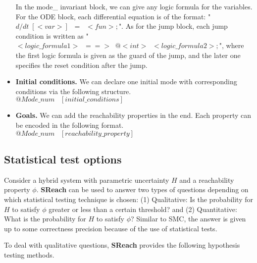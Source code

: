 \begin{itemize}
In the mode\_ invariant block, we can give any logic formula for the variables. For the ODE block, each differential equation is of the format: "$d/dt \; [<var>]\;\;=\;\;<fun>;$". As for the jump block, each jump condition is written as "$<logic\_formula1> \;\; ==> \;\; @<int>\;\;<logic\_formula2>;$", where the first logic formula is given as the guard of the jump, and the later one specifies the reset condition after the jump.\\

\item {\bf Initial conditions.} We can declare one initial mode with corresponding conditions via the following structure.\\

$
@Mode\_num\;\;\; [initial\_conditions]
$\\

\item{\bf Goals.} We can add the reachability properties in the end. Each property can be encoded in the following format.\\

$
@Mode\_num \;\;\; [reachability\_property]
$\\

\end{itemize}


\subsection{Statistical test options}

Consider a hybrid system with parametric uncertainty $H$ and a reachability property $\phi$. {\bf SReach} can be used to answer two types of questions depending on which statistical testing technique is chosen: (1) Qualitative: Is the probability for $H$ to satisfy $\phi$ greater or less than a certain threshold? and
(2) Quantitative: What is the probability for $H$ to satisfy $\phi$? Similar to SMC, the answer is given up to some correctness precision because of the use of statistical tests. 

To deal with qualitative questions, {\bf SReach} provides the following hypothesis testing methods.

